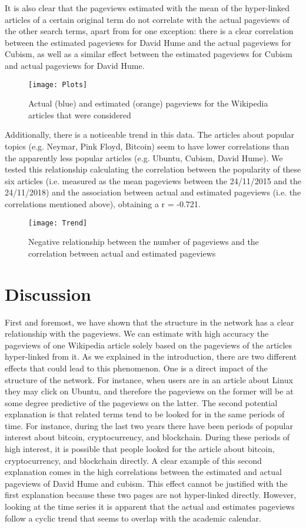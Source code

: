 \documentclass[11pt]{article}
\begin{document}
It is also clear that the pageviews estimated with the mean of the hyper-linked articles of a certain original term do not correlate with the actual pageviews of the other search terms, apart from for one exception: there is a clear correlation between the estimated pageviews for David Hume and the actual pageviews for Cubism, as well as a similar effect between the estimated pageviews for Cubism and actual pageviews for David Hume.

\begin{figure}[H]
	\centering
	\texttt{[image: Plots]}
	\caption{Actual (blue) and estimated (orange) pageviews for the Wikipedia articles that were considered}
\end{figure}

Additionally, there is a noticeable trend in this data. The articles about popular topics (e.g. Neymar, Pink Floyd, Bitcoin) seem to have lower correlations than the apparently less popular articles (e.g. Ubuntu, Cubism, David Hume). We tested this relationship calculating the correlation between the popularity of these six articles (i.e. measured as the mean pageviews between the 24/11/2015 and the 24/11/2018) and the association between actual and estimated pageviews (i.e. the correlations mentioned above), obtaining a r = -0.721. 

\begin{figure}[H]
	\centering
	\texttt{[image: Trend]}
	\caption{Negative relationship between the number of pageviews and the correlation between actual and estimated pageviews}
\end{figure}

\section{Discussion}

First and foremost, we have shown that the structure in the network has a clear relationship with the pageviews. We can estimate with high accuracy the pageviews of one Wikipedia article solely based on the pageviews of the articles hyper-linked from it. As we explained in the introduction, there are two different effects that could lead to this phenomenon. One is a direct impact of the structure of the network. For instance, when users are in an article about Linux they may click on Ubuntu, and therefore the pageviews on the former will be at some degree predictive of the pageviews on the latter. The second potential explanation is that related terms tend to be looked for in the same periods of time. For instance, during the last two years there have been periods of popular interest about bitcoin, cryptocurrency, and blockchain. During these periods of high interest, it is possible that people looked for the article about bitcoin, cryptocurrency, and blockchain directly. A clear example of this second explanation comes in the high correlations between the estimated and actual pageviews of David Hume and cubism. This effect cannot be justified with the first explanation because these two pages are not hyper-linked directly. However, looking at the time series it is apparent that the actual and estimates pageviews follow a cyclic trend that seems to overlap with the academic calendar.
\end{document}
